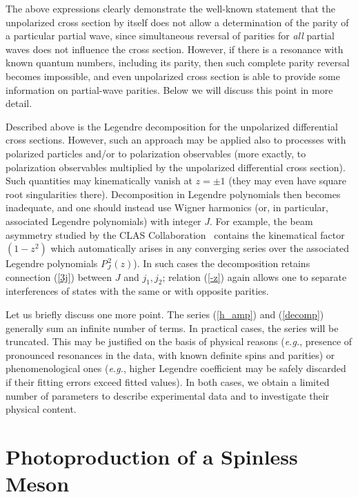 \documentclass[prc,reprint,onecolumn,amsmath,amssymb,superscriptaddress]{revtex4-1}
\begin{document}
The above expressions clearly demonstrate the well-known statement that the 
unpolarized cross section by itself does not allow a determination of the parity of a 
particular partial wave, since simultaneous reversal of parities for 
\textit{all} partial waves does not influence the cross section. However, if 
there is a resonance with known quantum numbers, including its parity, then 
such complete parity reversal becomes impossible, and even unpolarized cross 
section is able to provide some information on partial-wave parities. Below 
we will discuss this point in more detail.

Described above is the Legendre decomposition for the unpolarized 
differential cross sections. However, such an approach may be applied 
also to processes with polarized particles and/or to polarization 
observables (more exactly, to polarization observables multiplied by the 
unpolarized differential cross section). Such quantities may kinematically 
vanish at $z=\pm1$ (they may even have square root singularities there). 
Decomposition in Legendre polynomials then becomes inadequate, and one 
should instead use Wigner harmonics (or, in particular, associated 
Legendre polynomials) with integer $J$. For example, the beam asymmetry 
studied by the CLAS Collaboration~\cite{CLAS} contains the kinematical 
factor $(1-z^2)$ which automatically arises in any converging series over 
the associated Legendre polynomials $P_J^{\,2}(z)$). In such cases the 
decomposition retains connection (\ref{3j}) between $J$ and $j_1, j_2$; 
relation (\ref{-z}) again allows one to separate interferences of states with 
the same or with opposite parities.

Let us briefly discuss one more point. The series (\ref{h_amp}) and 
(\ref{decomp}) generally sum an infinite number of terms. In practical cases, 
the series will be truncated. This may be justified on the basis of physical 
reasons (\textit{e.g.}, presence of pronounced resonances in the data, 
with known definite spins and parities) or phenomenological ones 
(\textit{e.g.}, higher Legendre coefficient may be safely discarded if their 
fitting errors exceed fitted values). In both cases, we obtain a 
limited number of parameters to describe experimental data and to 
investigate their physical content.

\section{Photoproduction of a Spinless Meson}
\label{sec:photo}
\end{document}
